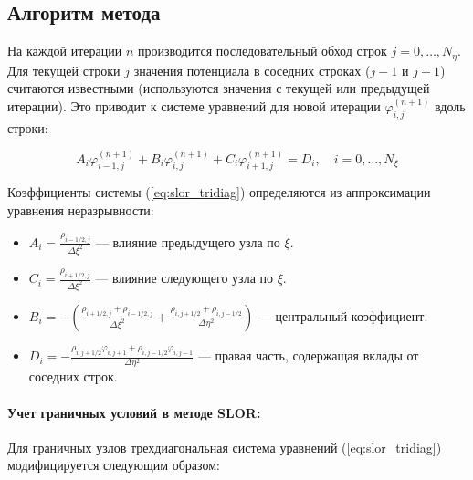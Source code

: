 \documentclass[a4paper,12pt]{article}
\begin{document}
	\subsection{Алгоритм метода}
	
	На каждой итерации $n$ производится последовательный обход строк $j = 0, \dots, N_\eta$. Для текущей строки $j$ значения потенциала в соседних строках ($j-1$ и $j+1$) считаются известными (используются значения с текущей или предыдущей итерации). Это приводит к системе уравнений для новой итерации $\varphi_{i,j}^{(n+1)}$ вдоль строки:
	
	\begin{equation}
		A_i \varphi_{i-1,j}^{(n+1)} + B_i \varphi_{i,j}^{(n+1)} + C_i \varphi_{i+1,j}^{(n+1)} = D_i, \quad i = 0, \dots, N_\xi
		\label{eq:slor_tridiag}
	\end{equation}
	
	Коэффициенты системы (\ref{eq:slor_tridiag}) определяются из аппроксимации уравнения неразрывности:
	
	\begin{itemize}
		\item $A_i = \displaystyle \frac{\rho_{i-1/2,j}}{\Delta \xi^2}$ — влияние предыдущего узла по $\xi$.
		\item $C_i = \displaystyle \frac{\rho_{i+1/2,j}}{\Delta \xi^2}$ — влияние следующего узла по $\xi$.
		\item $B_i = \displaystyle -\left( \frac{\rho_{i+1/2,j} + \rho_{i-1/2,j}}{\Delta \xi^2} + \frac{\rho_{i,j+1/2} + \rho_{i,j-1/2}}{\Delta \eta^2} \right)$ — центральный коэффициент.
		\item $D_i = \displaystyle - \frac{\rho_{i,j+1/2} \varphi_{i,j+1} + \rho_{i,j-1/2} \varphi_{i,j-1}}{\Delta \eta^2}$ — правая часть, содержащая вклады от соседних строк.
	\end{itemize}

	\paragraph{Учет граничных условий в методе SLOR:}
	
	Для граничных узлов трехдиагональная система уравнений (\ref{eq:slor_tridiag}) модифицируется следующим образом:
	
\end{document}
